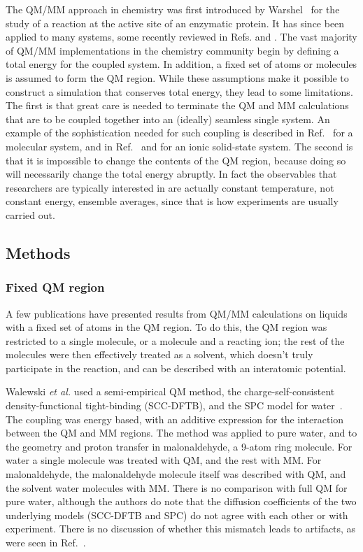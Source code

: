\documentclass[11pt]{revtex4}
\begin{document}
The QM/MM approach in chemistry was first introduced by
Warshel~\cite{warshel_j_mol_biol_1976a} for the study of a reaction
at the active site of an enzymatic protein.  It has since been
applied to many systems, some recently reviewed in
Refs.  and
.  The vast majority of QM/MM
implementations in the chemistry community begin by defining a total
energy for the coupled system.  In addition, a fixed set of atoms
or molecules is assumed to form the QM region.  While these assumptions
make it possible to construct a simulation that conserves total
energy, they lead to some limitations.  The first is that great
care is needed to terminate the QM and MM calculations that are to
be coupled together into an (ideally) seamless single system.  An
example of the sophistication needed for such coupling is described
in Ref.~ for a molecular system, and in
Ref.~ and  for an ionic solid-state
system.  The second is that it is impossible to change the contents
of the QM region, because doing so will necessarily change the total
energy abruptly.  In fact the observables that researchers are typically
interested in are actually constant temperature, not constant energy,
ensemble averages, since that is how experiments are usually carried
out.

\subsection{Methods}

\subsubsection{Fixed QM region}

A few publications
have presented results from QM/MM calculations on liquids with a
fixed set of atoms in the QM region.  To do this, the QM region was
restricted to a single molecule, or a molecule and a reacting ion;
the rest of the molecules were then effectively treated as a solvent,
which doesn't truly participate in the reaction, and can be described
with an interatomic potential.

Walewski {\it et al.} used a semi-empirical QM method, the
charge-self-consistent density-functional tight-binding (SCC-DFTB),
and the SPC model for water~\cite{walewski_chem_phys_lett_2004a}.
The coupling was energy based, with an additive expression for the
interaction between the QM and MM regions.  The method was applied
to pure water, and to the geometry and proton transfer in malonaldehyde,
a 9-atom ring molecule.  For water a single molecule was treated
with QM, and the rest with MM.  For malonaldehyde, the malonaldehyde
molecule itself was described with QM, and the solvent water molecules
with MM.  There is no comparison with full QM for pure water,
although the authors do note that the diffusion coefficients of the
two underlying models (SCC-DFTB and SPC) do not agree with each
other or with experiment.  There is no discussion of whether this
mismatch leads to artifacts, as were seen in
Ref.~.
\end{document}

